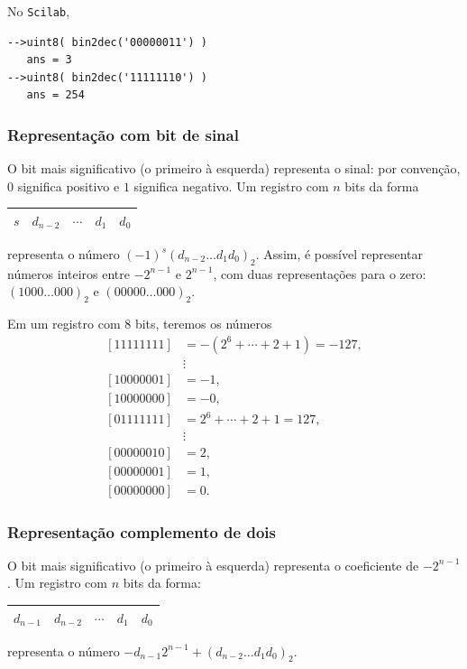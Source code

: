 \ifisscilab
\begin{ex}
  No \verb+Scilab+,
\begin{verbatim}
-->uint8( bin2dec('00000011') )
   ans = 3
-->uint8( bin2dec('11111110') )
   ans = 254
\end{verbatim}
\end{ex}
\fi

\subsubsection{Representação com bit de sinal}
O bit mais significativo (o primeiro à esquerda) representa o sinal: por convenção, $0$ significa positivo e $1$ significa negativo. Um registro com $n$ bits da forma
\begin{center}
  \begin{tabular}{|c|c|c|c|c|} \hline
    $s$ & $d_{n-2}$ & $\cdots$ & $d_1$ & $d_0$ \\\hline
  \end{tabular}  
\end{center}
representa o número $(-1)^s(d_{n-2}\ldots d_1d_0)_2$. Assim, é possível representar números inteiros entre $-2^{n-1}$ e $2^{n-1}$, com duas representações para o zero: $(1000\ldots 000)_2$ e $(00000\ldots 000)_2$.

\begin{ex}
Em um registro com $8$ bits, teremos os números
\begin{equation*}
\begin{split}
 [11111111] &= -(2^{6}+\cdots+2+1)=-127,\\
 &\vdots    \\
 [10000001] &= -1, \\
 [10000000] &= -0, \\
 [01111111] &= 2^6+\cdots+2+1=127, \\
 &\vdots    \\
 [00000010] &= 2, \\
 [00000001] &= 1, \\
 [00000000] &= 0. 
\end{split}  
\end{equation*}
\end{ex}


\subsubsection{Representação complemento de dois}
O bit mais significativo (o primeiro à esquerda) representa o coeficiente de $-2^{n-1}$.  Um registro com $n$ bits da forma:
\begin{center}
  \begin{tabular}{|c|c|c|c|c|} \hline
    $d_{n-1}$ & $d_{n-2}$ & $\cdots$ & $d_1$ & $d_0$\\\hline
  \end{tabular}    
\end{center}
representa o número $-d_{n-1}2^{n-1}+(d_{n-2}\ldots d_1d_0)_2$. 


